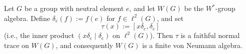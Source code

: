 Let $G$ be a group with neutral element $e$, and let $W(G)$ be the $W^*$-group algebra. Define $\delta_e(f) := f(e)$ for $f \in \ell^2(G)$, and set
$$
\tau(x) := [x\delta_e, \delta_e]
$$
(i.e., the inner product $(x\delta_e \mid \delta_e)$ on $\ell^2(G)$). Then $\tau$ is a faithful normal trace on $W(G)$, and consequently $W(G)$ is a finite von Neumann algebra.
